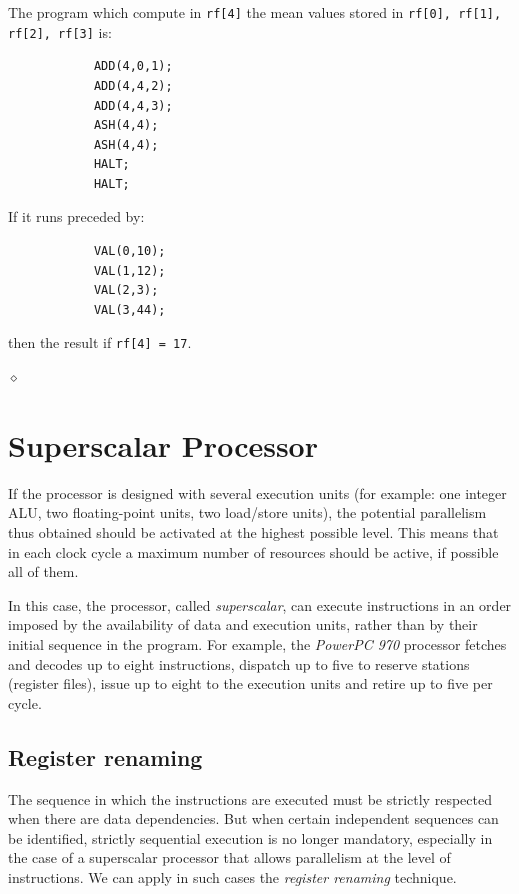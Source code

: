 \begin{exemplu}
The program which compute in {\tt rf[4]} the mean values stored in {\tt rf[0], rf[1], rf[2], rf[3]} is:
\begin{verbatim}
            ADD(4,0,1);
            ADD(4,4,2);
            ADD(4,4,3);
            ASH(4,4);
            ASH(4,4);
            HALT;
            HALT;
\end{verbatim}
If it runs  preceded by:
\begin{verbatim}
            VAL(0,10);
            VAL(1,12);
            VAL(2,3);
            VAL(3,44);
\end{verbatim}
then the result if {\tt rf[4] = 17}.

$\diamond$
\end{exemplu}

\section{Superscalar Processor}

If the processor is designed with several execution units (for example: one integer ALU, two floating-point units, two load/store units), the potential parallelism thus obtained should be activated at the highest possible level. This means that in each clock cycle a maximum number of resources should be active, if possible all of them.

In this case, the processor, called  {\em superscalar}, can execute instructions in an order imposed by the availability of data and execution units, rather than by their initial sequence in the  program. For example, the {\em PowerPC 970} processor  fetches and decodes up to eight instructions, dispatch up to five to reserve stations (register files), issue up to eight to the execution units and retire up to five per cycle.

\subsection{Register renaming}

The sequence in which the instructions are executed must be strictly respected when there are data dependencies. But when certain independent sequences can be identified, strictly sequential execution is no longer mandatory, especially in the case of a superscalar processor that allows parallelism at the level of instructions. We can apply in such cases the {\em register renaming} technique.

